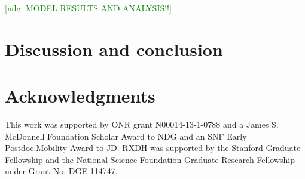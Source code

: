\documentclass[10pt,letterpaper]{article}
\newcommand{\ndg}[1]{\textcolor{Green}{[ndg: #1]}}
\begin{document}
\ndg{MODEL RESULTS AND ANALYSIS!!}


\section{\bf Discussion and conclusion}

\section{\bf Acknowledgments}

This work was supported by ONR grant N00014-13-1-0788 and a James S. McDonnell Foundation Scholar Award to NDG and an SNF Early Postdoc.Mobility Award to JD. RXDH was supported by the Stanford Graduate Fellowship and the National Science Foundation Graduate Research Fellowship under Grant No. DGE-114747.

\small




\setlength{\bibleftmargin}{.125in}
\setlength{\bibindent}{-\bibleftmargin}


\end{document}
